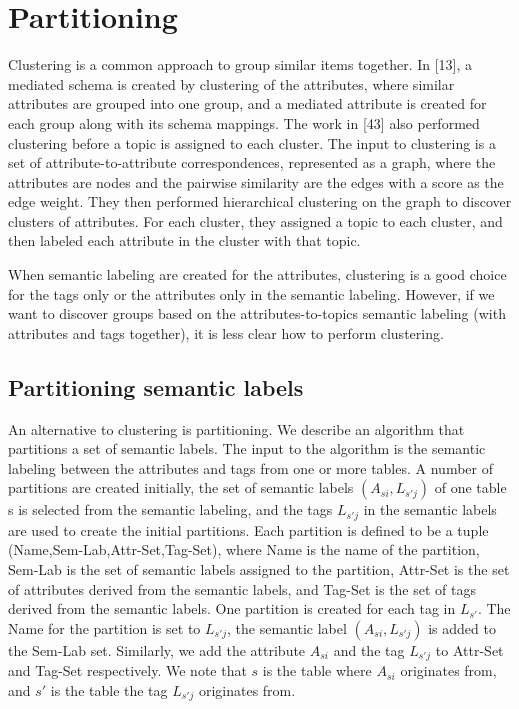 \section{Partitioning}
\label{sec:Partitioning}

Clustering is a common approach to group similar items together. In \cite{ilprints851}[13], a mediated schema is created by clustering of the attributes, where similar attributes are grouped into one group, and a mediated attribute is created for each group along with its schema mappings. The work in \cite{Smith2011Unity}[43] also performed clustering before a topic is assigned to each cluster. The input to clustering is a set of attribute-to-attribute correspondences, represented as a graph, where the attributes are nodes and the pairwise similarity are the edges with a score as the edge weight. They then performed hierarchical clustering on the graph to discover clusters of attributes. For each cluster, they assigned a topic to each cluster, and then labeled each attribute in the cluster with that topic.

When semantic labeling are created for the attributes, clustering is a good choice for the tags only or the attributes only in the semantic labeling. However, if we want to discover groups based on the attributes-to-topics semantic labeling (with attributes and tags together), it is less clear how to perform clustering.

\subsection{Partitioning semantic labels}
\label{ssec:PartitioningSemanticLabels}

An alternative to clustering is partitioning. We describe an algorithm that partitions a set of semantic labels. The input to the algorithm is the semantic labeling between the attributes and tags from one or more tables. A number of partitions are created initially, the set of semantic labels $(A_{si},L_{s'j})$ of one table s is selected from the semantic labeling, and the tags $L_{s'j}$ in the semantic labels are used to create the initial partitions. Each partition is defined to be a tuple (Name,Sem-Lab,Attr-Set,Tag-Set), where Name is the name of the partition, Sem-Lab is the set of semantic labels assigned to the partition, Attr-Set is the set of attributes derived from the semantic labels, and Tag-Set is the set of tags derived from the semantic labels. One partition is created for each tag in $L_{s'}$. The Name for the partition is set to $L_{s'j}$, the semantic label $(A_{si},L_{s'j})$ is added to the Sem-Lab set. Similarly, we add the attribute $A_{si}$ and the tag $L_{s'j}$ to Attr-Set and Tag-Set respectively. We note that $s$ is the table where $A_{si}$ originates from, and $s'$ is the table the tag $L_{s'j}$ originates from.

